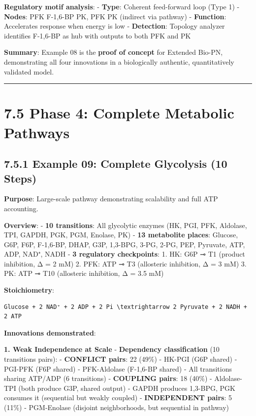 \textbf{Regulatory motif analysis}: - \textbf{Type}: Coherent
feed-forward loop (Type 1) - \textbf{Nodes}: PFK \textrightarrow F-1,6-BP \textrightarrow PK, PFK \textrightarrow
PK (indirect via pathway) - \textbf{Function}: Accelerates response when
energy is low - \textbf{Detection}: Topology analyzer identifies
F-1,6-BP as hub with outputs to both PFK and PK

\textbf{Summary}: Example 08 is the \textbf{proof of concept} for
Extended Bio-PN, demonstrating all four innovations in a biologically
authentic, quantitatively validated model.

\begin{center}\rule{0.5\linewidth}{0.5pt}\end{center}

\hypertarget{phase-4-complete-metabolic-pathways}{%
\section{7.5 Phase 4: Complete Metabolic
Pathways}\label{phase-4-complete-metabolic-pathways}}

\hypertarget{example-09-complete-glycolysis-10-steps}{%
\subsection{7.5.1 Example 09: Complete Glycolysis (10
Steps)}\label{example-09-complete-glycolysis-10-steps}}

\textbf{Purpose}: Large-scale pathway demonstrating scalability and full
ATP accounting.

\textbf{Overview}: - \textbf{10 transitions}: All glycolytic enzymes
(HK, PGI, PFK, Aldolase, TPI, GAPDH, PGK, PGM, Enolase, PK) - \textbf{13
metabolite places}: Glucose, G6P, F6P, F-1,6-BP, DHAP, G3P, 1,3-BPG,
3-PG, 2-PG, PEP, Pyruvate, ATP, ADP, NAD⁺, NADH - \textbf{3 regulatory
checkpoints}: 1. HK: G6P ⊸ T1 (product inhibition, Δ = 2 mM) 2. PFK: ATP
⊸ T3 (allosteric inhibition, Δ = 3 mM) 3. PK: ATP ⊸ T10 (allosteric
inhibition, Δ = 3.5 mM)

\textbf{Stoichiometry}:

\begin{lstlisting}
Glucose + 2 NAD⁺ + 2 ADP + 2 Pi \textrightarrow 2 Pyruvate + 2 NADH + 2 ATP
\end{lstlisting}

\textbf{Innovations demonstrated}:

\textbf{1. Weak Independence at Scale} \checkmark - \textbf{Dependency
classification} (10 transitions  pairs): - \textbf{CONFLICT pairs}:
22 (49\%) - HK-PGI (G6P shared) - PGI-PFK (F6P shared) - PFK-Aldolase
(F-1,6-BP shared) - All transitions sharing ATP/ADP (6 transitions) -
\textbf{COUPLING pairs}: 18 (40\%) - Aldolase-TPI (both produce G3P,
shared output) - GAPDH produces 1,3-BPG, PGK consumes it (sequential but
weakly coupled) - \textbf{INDEPENDENT pairs}: 5 (11\%) - PGM-Enolase
(disjoint neighborhoods, but sequential in pathway)

